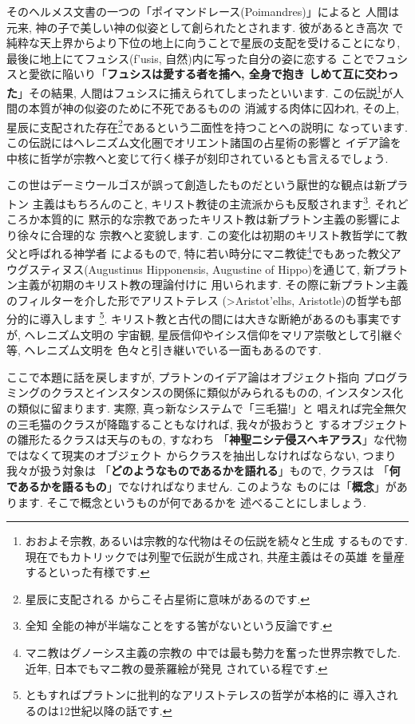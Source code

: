 そのヘルメス文書の一つの「ポイマンドレース(Poimandres)」\cite{柴田}によると
人間は元来, 神の子で美しい神の似姿として創られたとされます. 彼があるとき高次
で純粋な天上界からより下位の地上に向うことで星辰の支配を受けることになり,
 最後に地上にてフュシス(\textgreek{f'usis}, 自然)内に写った自分の姿に恋する
ことでフュシスと愛欲に陥いり「\textbf{フュシスは愛する者を捕へ, 全身で抱き
しめて互に交わった}」その結果, 人間はフュシスに捕えられてしまったといいます.
 この伝説\footnote{おおよそ宗教, あるいは宗教的な代物はその伝説を続々と生成
するものです. 現在でもカトリックでは列聖で伝説が生成され, 共産主義はその英雄
を量産するといった有様です. }が人間の本質が神の似姿のために不死であるものの
消滅する肉体に囚われ, その上, 星辰に支配された存在\footnote{星辰に支配される
からこそ占星術に意味があるのです.}であるという二面性を持つことへの説明に
なっています. この伝説にはヘレニズム文化圏でオリエント諸国の占星術の影響と
イデア論を中核に哲学が宗教へと変じて行く様子が刻印されているとも言えるでしょう.
\newline

この世はデーミウールゴスが誤って創造したものだという厭世的な観点は新プラトン
主義はもちろんのこと, キリスト教徒の主流派からも反駁されます\footnote{全知
全能の神が半端なことをする筈がないという反論です.}. それどころか本質的に
黙示的な宗教であったキリスト教は新プラトン主義の影響により徐々に合理的な
宗教へと変貌します. この変化は初期のキリスト教哲学にて教父と呼ばれる神学者
によるもので, 特に若い時分にマニ教徒\footnote{マニ教はグノーシス主義の宗教の
中では最も勢力を奮った世界宗教でした. 近年, 日本でもマニ教の曼荼羅絵が発見
されている程です.}でもあった教父アウグスティヌス(Augustinus Hipponensis,
 Augustine of Hippo)を通じて, 新プラトン主義が初期のキリスト教の理論付けに
用いられます. その際に新プラトン主義のフィルターを介した形でアリストテレス
(\textgreek{>Aristot'elhs}, Aristotle)の哲学も部分的に導入します
\footnote{ともすればプラトンに批判的なアリストテレスの哲学が本格的に
導入されるのは12世紀以降の話です\cite{アリストテレス1}\cite{普遍論争}.}.
 キリスト教と古代の間には大きな断絶があるのも事実ですが, ヘレニズム文明の
宇宙観, 星辰信仰やイシス信仰をマリア崇敬として引継ぐ等, ヘレニズム文明を
色々と引き継いでいる一面もあるのです.
\newline

ここで本題に話を戻しますが, プラトンのイデア論はオブジェクト指向
プログラミングのクラスとインスタンスの関係に類似がみられるものの,
 インスタンス化の類似に留まります. 実際, 真っ新なシステムで「三毛猫!」と
唱えれば完全無欠の三毛猫のクラスが降臨することもなければ, 我々が扱おうと
するオブジェクトの雛形たるクラスは天与のもの, すなわち
「\textbf{神聖ニシテ侵スヘキアラス}」な代物ではなくて現実のオブジェクト
からクラスを抽出しなければならない, つまり我々が扱う対象は
「\textbf{どのようなものであるかを語れる}」もので, クラスは
「\textbf{何であるかを語るもの}」でなければなりません. このような
ものには「\textbf{概念}」があります. そこで概念というものが何であるかを
述べることにしましょう.

